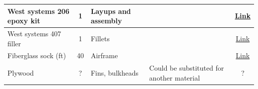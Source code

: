 \begin{table}
\begin{tabular}{| p{2in} | c | p{1in} | p{1in} | c |}
        \hline
        West systems 206 epoxy kit & 1        & Layups and assembly     &                                           & \href{https://www.leevalley.com/en-ca/shop/tools/supplies/adhesives/glue/20016-west-system-epoxy-kits?item=54Z2001}{Link}                                                                                                                                                                                                                                                                                                                                                                                                                                                                                     \\
        \hline
        West systems 407 filler    & 1        & Fillets                 &                                           & \href{https://www.leevalley.com/en-ca/shop/tools/supplies/adhesives/glue/102525-fairing-filler-for-west-system-epoxy?item=54Z2110}{Link}                                                                                                                                                                                                                                                                                                                                                                                                                                                                      \\
        \hline
        Fiberglass sock (ft)       & 40       & Airframe                &                                           & \href{https://sollercompositesllc.com/product/natural-uncolored-3-0in-med-fiberglass-sleeves/}{Link}                                                                                                                                                                                                                                                                                                                                                                                                                                                                                                          \\
        \hline
        Plywood                    & ?        & Fins, bulkheads         & Could be substituted for another material & ?                                                                                                                                                                                                                                                                                                                                                                                                                                                                                                                                                                                                             \\

\end{tabular}
\end{table}
